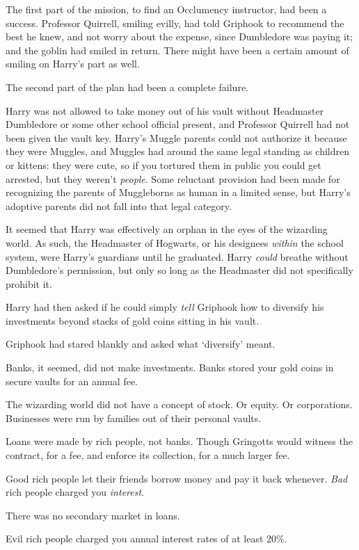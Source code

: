 The first part of the mission, to find an Occlumency instructor, had been a
success. Professor Quirrell, smiling evilly, had told Griphook to recommend the
best he knew, and not worry about the expense, since Dumbledore was paying it;
and the goblin had smiled in return. There might have been a certain amount of
smiling on Harry's part as well.

The second part of the plan had been a complete failure.

Harry was not allowed to take money out of his vault without Headmaster
Dumbledore or some other school official present, and Professor Quirrell had
not been given the vault key. Harry's Muggle parents could not authorize it
because they were Muggles, and Muggles had around the same legal standing as
children or kittens: they were cute, so if you tortured them in public you
could get arrested, but they weren't \emph{people}. Some reluctant provision
had been made for recognizing the parents of Muggleborns as human in a limited
sense, but Harry's adoptive parents did not fall into that legal category.

It seemed that Harry was effectively an orphan in the eyes of the wizarding
world. As such, the Headmaster of Hogwarts, or his designees \emph{within} the
school system, were Harry's guardians until he graduated. Harry \emph{could}
breathe without Dumbledore's permission, but only so long as the Headmaster did
not specifically prohibit it.

Harry had then asked if he could simply \emph{tell} Griphook how to diversify
his investments beyond stacks of gold coins sitting in his vault.

Griphook had stared blankly and asked what `diversify' meant.

Banks, it seemed, did not make investments. Banks stored your gold coins in
secure vaults for an annual fee.

The wizarding world did not have a concept of stock. Or equity. Or
corporations. Businesses were run by families out of their personal vaults.

Loans were made by rich people, not banks. Though Gringotts would witness the
contract, for a fee, and enforce its collection, for a much larger fee.

Good rich people let their friends borrow money and pay it back whenever.
\emph{Bad} rich people charged you \emph{interest.}

There was no secondary market in loans.

Evil rich people charged you annual interest rates of at least 20\%.

